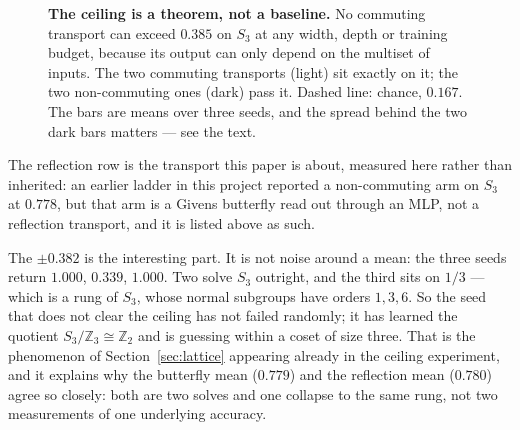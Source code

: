 \documentclass[10pt]{article}
\begin{document}
\begin{figure}[t]\centering
{}
\caption{\textbf{The ceiling is a theorem, not a baseline.} No commuting transport can exceed
$0.385$ on $S_3$ at any width, depth or training budget, because its output can only depend on the
multiset of inputs. The two commuting transports (light) sit exactly on it; the two non-commuting
ones (dark) pass it. Dashed line: chance, $0.167$. The bars are means over three seeds, and the
spread behind the two dark bars matters --- see the text.}
\label{fig:ceiling}
\end{figure}

The reflection row is the transport this paper is about, measured here rather than inherited: an
earlier ladder in this project reported a non-commuting arm on $S_3$ at $0.778$, but that arm is a
Givens butterfly read out through an MLP, not a reflection transport, and it is listed above as such.

The $\pm0.382$ is the interesting part. It is not noise around a mean: the three seeds return
$1.000$, $0.339$, $1.000$. Two solve $S_3$ outright, and the third sits on $1/3$ --- which is a rung
of $S_3$, whose normal subgroups have orders $1,3,6$. So the seed that does not clear the ceiling has
not failed randomly; it has learned the quotient $S_3/\mathbb{Z}_3\cong\mathbb{Z}_2$ and is guessing
within a coset of size three. That is the phenomenon of Section~\ref{sec:lattice} appearing already
in the ceiling experiment, and it explains why the butterfly mean ($0.779$) and the reflection mean
($0.780$) agree so closely: both are two solves and one collapse to the same rung, not two
measurements of one underlying accuracy.
\end{document}
